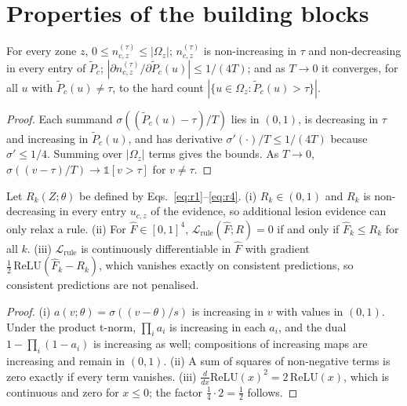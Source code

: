 \section{Properties of the building blocks}
\label{app:proofs}

\begin{proposition}
For every zone $z$, $0\le n^{(\tau)}_{c,z}\le|\Omega_z|$; $n^{(\tau)}_{c,z}$ is non-increasing in $\tau$ and non-decreasing in every entry of $\tilde P_c$; $|\partial n^{(\tau)}_{c,z}/\partial\tilde P_c(u)|\le 1/(4T)$; and as $T\to0$ it converges, for all $u$ with $\tilde P_c(u)\neq\tau$, to the hard count $|\{u\in\Omega_z:\tilde P_c(u)>\tau\}|$.
\end{proposition}
\begin{proof}
Each summand $\sigma((\tilde P_c(u)-\tau)/T)$ lies in $(0,1)$, is decreasing in $\tau$ and increasing in $\tilde P_c(u)$, and has derivative $\sigma'(\cdot)/T\le1/(4T)$ because $\sigma'\le1/4$. Summing over $|\Omega_z|$ terms gives the bounds. As $T\to0$, $\sigma((v-\tau)/T)\to\mathbb 1[v>\tau]$ for $v\ne\tau$.
\end{proof}

\begin{proposition}
Let $R_k(Z;\theta)$ be defined by Eqs.~\eqref{eq:r1}--\eqref{eq:r4}. (i) $R_k\in(0,1)$ and $R_k$ is non-decreasing in every entry $u_{c,z}$ of the evidence, so additional lesion evidence can only relax a rule. (ii) For $\hat F\in[0,1]^4$, $\mathcal L_{\mathrm{rule}}(\hat F;R)=0$ if and only if $\hat F_k\le R_k$ for all $k$. (iii) $\mathcal L_{\mathrm{rule}}$ is continuously differentiable in $\hat F$ with gradient $\frac12\,\mathrm{ReLU}(\hat F_k-R_k)$, which vanishes exactly on consistent predictions, so consistent predictions are not penalised.
\end{proposition}
\begin{proof}
(i) $a(v;\theta)=\sigma((v-\theta)/s)$ is increasing in $v$ with values in $(0,1)$. Under the product t-norm, $\prod_i a_i$ is increasing in each $a_i$, and the dual $1-\prod_i(1-a_i)$ is increasing as well; compositions of increasing maps are increasing and remain in $(0,1)$. (ii) A sum of squares of non-negative terms is zero exactly if every term vanishes. (iii) $\frac{d}{dx}\mathrm{ReLU}(x)^2=2\,\mathrm{ReLU}(x)$, which is continuous and zero for $x\le0$; the factor $\tfrac14\cdot2=\tfrac12$ follows.
\end{proof}

